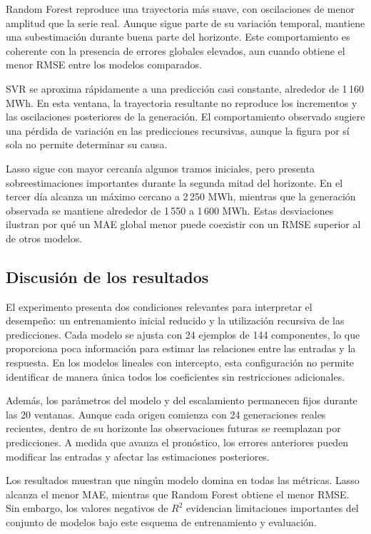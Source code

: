 Random Forest reproduce una trayectoria más suave, con oscilaciones de menor amplitud que la serie real. Aunque sigue parte de su variación temporal, mantiene una subestimación durante buena parte del horizonte. Este comportamiento es coherente con la presencia de errores globales elevados, aun cuando obtiene el menor RMSE entre los modelos comparados.

SVR se aproxima rápidamente a una predicción casi constante, alrededor de 1\,160 MWh. En esta ventana, la trayectoria resultante no reproduce los incrementos y las oscilaciones posteriores de la generación. El comportamiento observado sugiere una pérdida de variación en las predicciones recursivas, aunque la figura por sí sola no permite determinar su causa.

Lasso sigue con mayor cercanía algunos tramos iniciales, pero presenta sobreestimaciones importantes durante la segunda mitad del horizonte. En el tercer día alcanza un máximo cercano a 2\,250 MWh, mientras que la generación observada se mantiene alrededor de 1\,550 a 1\,600 MWh. Estas desviaciones ilustran por qué un MAE global menor puede coexistir con un RMSE superior al de otros modelos.

\subsection{Discusión de los resultados}

El experimento presenta dos condiciones relevantes para interpretar el desempeño: un entrenamiento inicial reducido y la utilización recursiva de las predicciones. Cada modelo se ajusta con 24 ejemplos de 144 componentes, lo que proporciona poca información para estimar las relaciones entre las entradas y la respuesta. En los modelos lineales con intercepto, esta configuración no permite identificar de manera única todos los coeficientes sin restricciones adicionales.

Además, los parámetros del modelo y del escalamiento permanecen fijos durante las 20 ventanas. Aunque cada origen comienza con 24 generaciones reales recientes, dentro de su horizonte las observaciones futuras se reemplazan por predicciones. A medida que avanza el pronóstico, los errores anteriores pueden modificar las entradas y afectar las estimaciones posteriores.

Los resultados muestran que ningún modelo domina en todas las métricas. Lasso alcanza el menor MAE, mientras que Random Forest obtiene el menor RMSE. Sin embargo, los valores negativos de $R^2$ evidencian limitaciones importantes del conjunto de modelos bajo este esquema de entrenamiento y evaluación.

